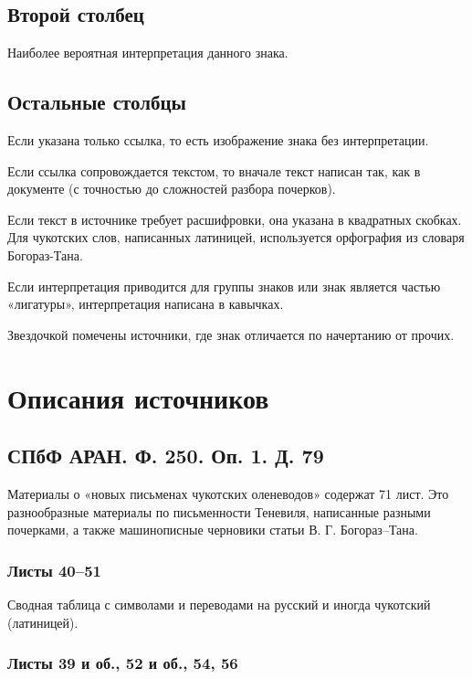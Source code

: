 \documentclass{article}
\begin{document}
\subsection{Второй столбец}
Наиболее вероятная интерпретация данного знака.

\subsection{Остальные столбцы}

Если указана только ссылка, то есть изображение знака без интерпретации.

Если ссылка сопровождается текстом, то вначале текст написан так, как в документе (с точностью до сложностей разбора почерков). 

Если текст в источнике требует расшифровки, она указана в квадратных скобках. Для чукотских слов, написанных латиницей, используется орфография из словаря Богораз-Тана\cite{bogoraz1937}.

Если интерпретация приводится для группы знаков или знак является частью «лигатуры», интерпретация написана в кавычках.

Звездочкой помечены источники, где знак отличается по начертанию от прочих.

\section{Описания источников} 

\subsection{СПбФ АРАН. Ф. 250. Оп. 1. Д. 79}

Материалы о «новых письменах чукотских оленеводов» содержат 71 лист. Это разнообразные материалы по письменности Теневиля, написанные разными почерками, а также машинописные черновики статьи В. Г. Богораз–Тана. 

\subsubsection{Листы 40–51}

Сводная таблица с символами и переводами на русский и иногда чукотский (латиницей).

\subsubsection{Листы 39 и об., 52 и об., 54, 56}
\end{document}
